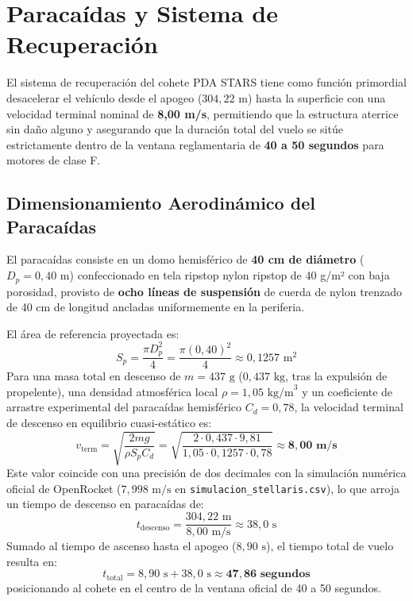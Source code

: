 \section{Paracaídas y Sistema de Recuperación}

El sistema de recuperación del cohete PDA STARS tiene como función primordial desacelerar el vehículo desde el apogeo ($304,22\text{ m}$) hasta la superficie con una velocidad terminal nominal de \textbf{8,00 m/s}, permitiendo que la estructura aterrice sin daño alguno y asegurando que la duración total del vuelo se sitúe estrictamente dentro de la ventana reglamentaria de \textbf{40 a 50 segundos} para motores de clase F.

\subsection{Dimensionamiento Aerodinámico del Paracaídas}
El paracaídas consiste en un domo hemisférico de \textbf{40 cm de diámetro} ($D_p = 0,40\text{ m}$) confeccionado en tela ripstop nylon ripstop de 40 g/m² con baja porosidad, provisto de \textbf{ocho líneas de suspensión} de cuerda de nylon trenzado de 40 cm de longitud ancladas uniformemente en la periferia.

El área de referencia proyectada es:
\begin{equation}
    S_p = \frac{\pi D_p^2}{4} = \frac{\pi (0,40)^2}{4} \approx 0,1257\text{ m}^2
\end{equation}
Para una masa total en descenso de $m = 437\text{ g}$ ($0,437\text{ kg}$, tras la expulsión de propelente), una densidad atmosférica local $\rho = 1,05\text{ kg/m}^3$ y un coeficiente de arrastre experimental del paracaídas hemisférico $C_d = 0,78$, la velocidad terminal de descenso en equilibrio cuasi-estático es:
\begin{equation}
    v_{\text{term}} = \sqrt{\frac{2 m g}{\rho S_p C_d}} = \sqrt{\frac{2 \cdot 0,437 \cdot 9,81}{1,05 \cdot 0,1257 \cdot 0,78}} \approx \mathbf{8,00\text{ m/s}}
\end{equation}
Este valor coincide con una precisión de dos decimales con la simulación numérica oficial de OpenRocket ($7,998\text{ m/s}$ en \texttt{simulacion\_stellaris.csv}), lo que arroja un tiempo de descenso en paracaídas de:
\begin{equation}
    t_{\text{descenso}} = \frac{304,22\text{ m}}{8,00\text{ m/s}} \approx 38,0\text{ s}
\end{equation}
Sumado al tiempo de ascenso hasta el apogeo ($8,90\text{ s}$), el tiempo total de vuelo resulta en:
\begin{equation}
    t_{\text{total}} = 8,90\text{ s} + 38,0\text{ s} \approx \mathbf{47,86\text{ segundos}}
\end{equation}
posicionando al cohete en el centro de la ventana oficial de 40 a 50 segundos.

